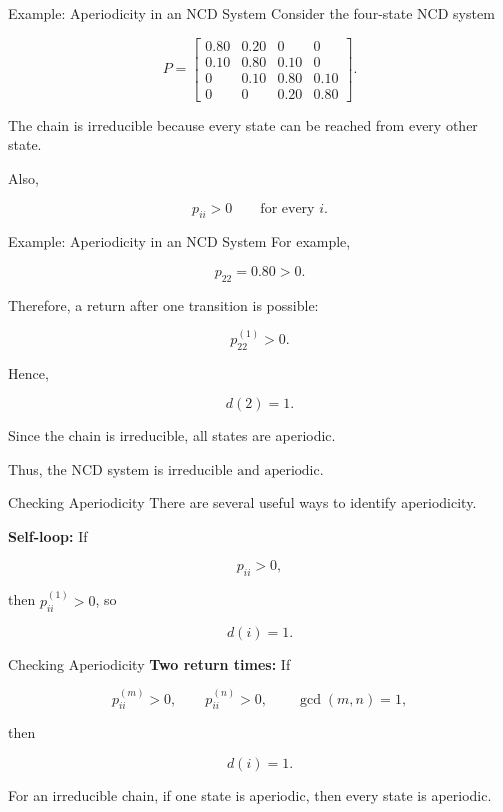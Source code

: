 \documentclass[
  ignorenonframetext,
  aspectratio=169,
]{beamer}
\begin{document}
\begin{frame}{Example: Aperiodicity in an NCD System}
\protect{}\label{example-aperiodicity-in-an-ncd-system}
Consider the four-state NCD system

\[
P=
\begin{bmatrix}
0.80&0.20&0&0\\
0.10&0.80&0.10&0\\
0&0.10&0.80&0.10\\
0&0&0.20&0.80
\end{bmatrix}.
\]

The chain is irreducible because every state can be reached from every
other state.

Also,

\[
p_{ii}>0
\qquad\text{for every }i.
\]
\end{frame}

\begin{frame}{Example: Aperiodicity in an NCD System}
\protect{}\label{example-aperiodicity-in-an-ncd-system-1}
For example,

\[
p_{22}=0.80>0.
\]

Therefore, a return after one transition is possible:

\[
p_{22}^{(1)}>0.
\]

Hence,

\[
d(2)=1.
\]

Since the chain is irreducible, all states are aperiodic.

Thus, the NCD system is \(\boxed{\text{irreducible and aperiodic}.}\)
\end{frame}

\begin{frame}{Checking Aperiodicity}
\protect{}\label{checking-aperiodicity}
There are several useful ways to identify aperiodicity.

\textbf{Self-loop:} If

\[
p_{ii}>0,
\]

then \(p_{ii}^{(1)}>0\), so

\[
d(i)=1.
\]
\end{frame}

\begin{frame}{Checking Aperiodicity}
\protect{}\label{checking-aperiodicity-1}
\textbf{Two return times:} If

\[
p_{ii}^{(m)}>0,\qquad
p_{ii}^{(n)}>0,
\qquad
\gcd(m,n)=1,
\]

then

\[
d(i)=1.
\]

For an irreducible chain, if one state is aperiodic, then every state is
aperiodic.
\end{frame}
\end{document}

